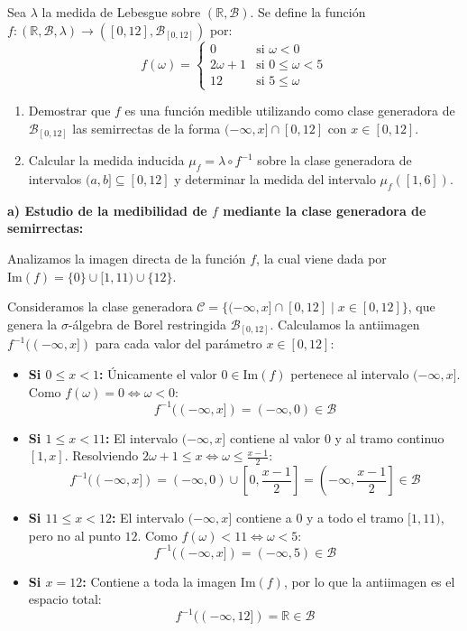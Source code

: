 \newpage
\begin{problema}
Sea $\lambda$ la medida de Lebesgue sobre $(\mathbb{R}, \mathcal{B})$. Se define la función $f : (\mathbb{R}, \mathcal{B}, \lambda) \to ([0, 12], \mathcal{B}_{[0,12]})$ por:
\[
    f(\omega) = \begin{cases} 0 & \text{si } \omega < 0 \\ 2\omega + 1 & \text{si } 0 \le \omega < 5 \\ 12 & \text{si } 5 \le \omega \end{cases}
\]
\begin{enumerate}[label=\alph*)]
    \item Demostrar que $f$ es una función medible utilizando como clase generadora de $\mathcal{B}_{[0,12]}$ las semirrectas de la forma $(-\infty, x] \cap [0,12]$ con $x \in [0, 12]$.
    \item Calcular la medida inducida $\mu_f = \lambda \circ f^{-1}$ sobre la clase generadora de intervalos $(a,b] \subseteq [0, 12]$ y determinar la medida del intervalo $\mu_f([1, 6])$.
\end{enumerate}

\tcblower

\textbf{a) Estudio de la medibilidad de $f$ mediante la clase generadora de semirrectas:}

Analizamos la imagen directa de la función $f$, la cual viene dada por $\mathrm{Im}(f) = \{0\} \cup [1, 11) \cup \{12\}$.

Consideramos la clase generadora $\mathcal{C} = \{(-\infty, x] \cap [0,12] \mid x \in [0, 12]\}$, que genera la $\sigma$-álgebra de Borel restringida $\mathcal{B}_{[0,12]}$. Calculamos la antiimagen $f^{-1}((-\infty, x])$ para cada valor del parámetro $x \in [0, 12]$:

\begin{itemize}
    \item \textbf{Si $0 \le x < 1$:} Únicamente el valor $0 \in \mathrm{Im}(f)$ pertenece al intervalo $(-\infty, x]$. Como $f(\omega) = 0 \iff \omega < 0$:
    \[
        f^{-1}((-\infty, x]) = (-\infty, 0) \in \mathcal{B}
    \]
    \item \textbf{Si $1 \le x < 11$:} El intervalo $(-\infty, x]$ contiene al valor $0$ y al tramo continuo $[1, x]$. Resolviendo $2\omega + 1 \le x \iff \omega \le \frac{x-1}{2}$:
    \[
        f^{-1}((-\infty, x]) = (-\infty, 0) \cup \left[0, \frac{x-1}{2}\right] = \left(-\infty, \frac{x-1}{2}\right] \in \mathcal{B}
    \]
    \item \textbf{Si $11 \le x < 12$:} El intervalo $(-\infty, x]$ contiene a $0$ y a todo el tramo $[1, 11)$, pero no al punto $12$. Como $f(\omega) < 11 \iff \omega < 5$:
    \[
        f^{-1}((-\infty, x]) = (-\infty, 5) \in \mathcal{B}
    \]
    \item \textbf{Si $x = 12$:} Contiene a toda la imagen $\mathrm{Im}(f)$, por lo que la antiimagen es el espacio total:
    \[
        f^{-1}((-\infty, 12]) = \mathbb{R} \in \mathcal{B}
    \]
\end{itemize}


\end{problema}
